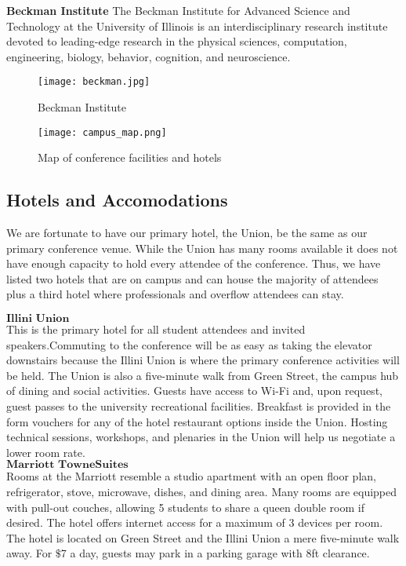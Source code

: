 \textbf{Beckman Institute}
The Beckman Institute for Advanced Science and Technology at the University of Illinois is an interdisciplinary research institute devoted to leading-edge research in the physical sciences, computation, engineering, biology, behavior, cognition, and neuroscience.\\

\begin{figure}[H]
	\centering
	\texttt{[image: beckman.jpg]}
	\caption{Beckman Institute}
	\label{fig:beckman}
\end{figure}

\begin{figure}[H]
	\centering
	\texttt{[image: campus\_map.png]}
	\caption{Map of conference facilities and hotels}
	\label{fig:conf-map}
\end{figure}


\subsection{Hotels and Accomodations}
We are fortunate to have our primary hotel, the Union, be the same as our primary conference venue. While the Union has many rooms available it does not have enough capacity to hold every attendee of the conference. Thus, we have listed two hotels that are on campus and can house the majority of attendees plus a third hotel where professionals and overflow attendees can stay. 

$\textbf{Illini Union}$\\
This is the primary hotel for all student attendees and invited speakers.Commuting to the conference will be as easy as taking the elevator downstairs because the Illini Union is where the primary conference activities will be held. The Union is also a five-minute walk from Green Street, the campus hub of dining and social activities. Guests have access to Wi-Fi and, upon request, guest passes to the university recreational facilities. Breakfast is provided in the form vouchers for any of the hotel restaurant options inside the Union. Hosting technical sessions, workshops, and plenaries in the Union will help us negotiate a lower room rate.\\

$\textbf{Marriott TowneSuites}$\\
Rooms at the Marriott resemble a studio apartment with an open floor plan, refrigerator, stove, microwave, dishes, and dining area. Many rooms are equipped with pull-out couches, allowing 5 students to share a queen double room if desired. The hotel offers internet access for a maximum of 3 devices per room. The hotel is located on Green Street and the Illini Union a mere five-minute walk away. For $\$$7 a day, guests may park in a parking garage with 8ft clearance.


